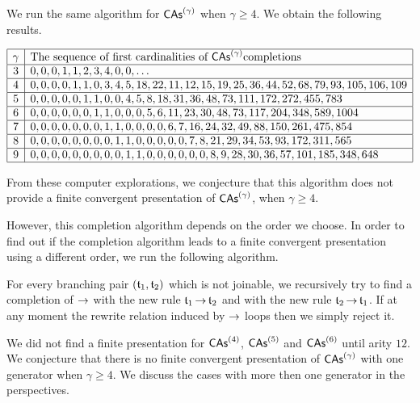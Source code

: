 We run the same algorithm for $\mathsf{CAs}^{\left(\gamma\right)}$ when $\gamma \geq 4$.
We obtain the following results.

\begin{center}
  \begin{math} \label{arr:completions_CAs}
    \begin{array}{|c|l|} 
      \hline
      \gamma & \mbox{The sequence of first cardinalities of } 
       \mathsf{CAs}^{\left(\gamma\right)} \mbox{completions}\\ \hline
      3 & 0, 0, 0, 1, 1, 2, 3, 4, 0, 0, \dots \\ \hline
      4 & 0, 0, 0, 0, 1, 1, 0, 3, 4, 5, 18, 22, 11, 12, 15, 19, 25, 36,
       44, 52, 68, 79, 93, 105, 106, 109 \\ \hline
      5 & 0, 0, 0, 0, 0, 1, 1, 0, 0, 4, 5, 8, 18, 31, 36, 48, 73, 111,
       172, 272, 455, 783 \\ \hline
      6 & 0, 0, 0, 0, 0, 0, 1, 1, 0, 0, 0, 5, 6, 11, 23, 30, 48, 73, 
      117, 204, 348, 589, 1004 \\ \hline
      7 & 0, 0, 0, 0, 0, 0, 0, 1, 1, 0, 0, 0, 0, 6, 7, 16, 24, 32, 49, 
      88, 150, 261, 475, 854\\ \hline
      8 & 0, 0, 0, 0, 0, 0, 0, 0, 1, 1, 0, 0, 0, 0, 0, 7, 8, 21, 29, 
      34, 53, 93, 172, 311, 565\\ \hline
      9 & 0, 0, 0, 0, 0, 0, 0, 0, 0, 1, 1, 0, 0, 0, 0, 0, 0, 8, 9, 28, 
      30, 36, 57, 101, 185, 348, 648\\ \hline
    \end{array}
  \end{math}
\end{center}
\medbreak

From these computer explorations, we conjecture that this algorithm
does not provide a finite convergent presentation of $\mathsf{CAs}^{\left(\gamma\right)}$, 
when $\gamma \ge 4$.

However, this completion algorithm depends on the order we choose.
In order to find out if the completion algorithm leads to a finite 
convergent presentation using a different order, we run the following
algorithm.

For every branching pair $(\mathfrak{t}_1, \mathfrak{t}_2)$ which is not joinable,
we recursively try to find a completion of $\operatorname{\to}$ with
the new rule $\mathfrak{t}_1 \operatorname{\to}  \mathfrak{t}_2$ and with the new rule 
$\mathfrak{t}_2 \operatorname{\to}  \mathfrak{t}_1$. If at any moment the rewrite relation induced by
$\operatorname{\to}$ loops then we simply reject it.

We did not find a finite presentation for $\mathsf{CAs}^{\left(4\right)}$, $\mathsf{CAs}^{\left(5\right)}$ and 
$\mathsf{CAs}^{\left(6\right)}$ until arity $12$. 
We conjecture that there is no finite convergent presentation
of $\mathsf{CAs}^{\left(\gamma\right)}$ with one generator when $\gamma \geq 4$.
We discuss the cases with more then one generator in the perspectives.
\medbreak

